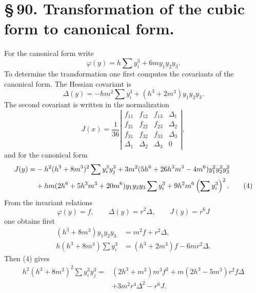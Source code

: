 \documentclass[11pt]{article}
\begin{document}
\section*{\S\,90. Transformation of the cubic form to canonical form.}

For the canonical form write
\begin{equation}
 \varphi(y)=h\sum y_i^3+6my_1y_2y_3.
 \tag{1}
\end{equation}
To determine the transformation one first computes the covariants of the canonical form. The Hessian covariant is
\begin{equation}
 \Delta(y)=-hm^2\sum y_i^3+(h^3+2m^3)y_1y_2y_3.
 \tag{2}
\end{equation}
The second covariant is written in the normalization
\begin{equation}
 J(x)=\frac1{36}
 \left|\begin{array}{cccc}
 f_{11}&f_{12}&f_{13}&\Delta_1\\
 f_{21}&f_{22}&f_{23}&\Delta_2\\
 f_{31}&f_{32}&f_{33}&\Delta_3\\
 \Delta_1&\Delta_2&\Delta_3&0
 \end{array}\right|,
 \tag{3}
\end{equation}
and for the canonical form
\begin{align}
 J(y)=&-h^2(h^3+8m^3)^2\sum y_i^3y_j^3
      +3m^2(5h^6+26h^3m^3-4m^6)y_1^2y_2^2y_3^2\notag\\
 &+hm(2h^6+5h^3m^3+20m^6)y_1y_2y_3\sum y_i^3
      +9h^2m^6\left(\sum y_i^3\right)^2 .
 \tag{4}
\end{align}
From the invariant relations
\begin{equation}
 \varphi(y)=f,
 \qquad \Delta(y)=r^2\Delta,
 \qquad J(y)=r^6J
 \tag{5}
\end{equation}
one obtains first
\begin{align}
 (h^3+8m^3)y_1y_2y_3&=m^2f+r^2\Delta,
 \tag{6}\\
 h(h^3+8m^3)\sum y_i^3&=(h^3+2m^3)f-6mr^2\Delta.
 \tag{7}
\end{align}
Then (4) gives
\begin{equation}
\begin{aligned}
 h^2(h^3+8m^3)^2\sum y_i^3y_j^3={}&(2h^3+m^3)m^3f^2
 +m(2h^3-5m^3)r^2f\Delta\\
&+3m^2r^4\Delta^2-r^6J.
\end{aligned}
\tag{8}
\end{equation}
\end{document}
